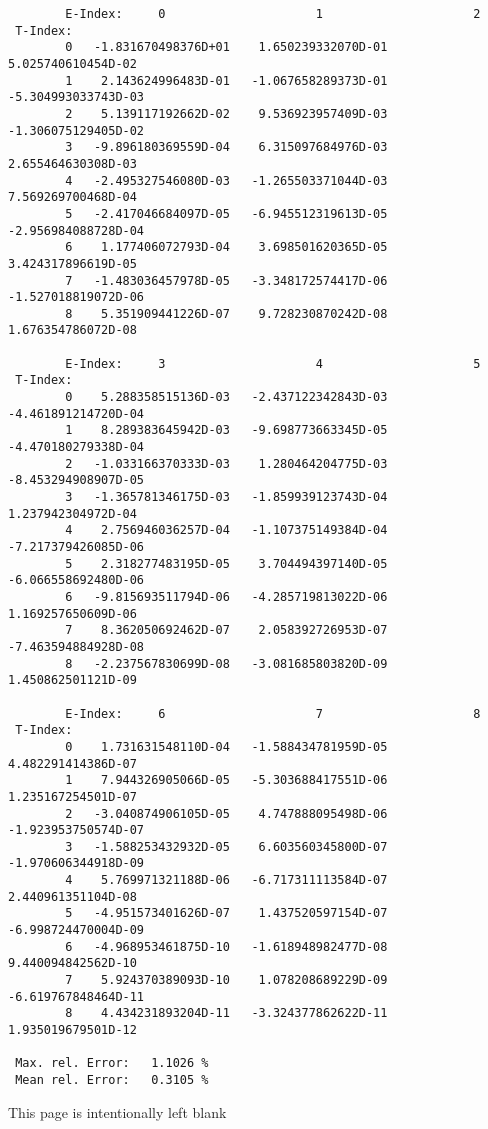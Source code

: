 \documentclass[12pt,dvipdfmx]{article}
\begin{document}
\begin{small}\begin{verbatim}
        E-Index:     0                     1                     2
 T-Index:
        0   -1.831670498376D+01    1.650239332070D-01    5.025740610454D-02
        1    2.143624996483D-01   -1.067658289373D-01   -5.304993033743D-03
        2    5.139117192662D-02    9.536923957409D-03   -1.306075129405D-02
        3   -9.896180369559D-04    6.315097684976D-03    2.655464630308D-03
        4   -2.495327546080D-03   -1.265503371044D-03    7.569269700468D-04
        5   -2.417046684097D-05   -6.945512319613D-05   -2.956984088728D-04
        6    1.177406072793D-04    3.698501620365D-05    3.424317896619D-05
        7   -1.483036457978D-05   -3.348172574417D-06   -1.527018819072D-06
        8    5.351909441226D-07    9.728230870242D-08    1.676354786072D-08

        E-Index:     3                     4                     5
 T-Index:
        0    5.288358515136D-03   -2.437122342843D-03   -4.461891214720D-04
        1    8.289383645942D-03   -9.698773663345D-05   -4.470180279338D-04
        2   -1.033166370333D-03    1.280464204775D-03   -8.453294908907D-05
        3   -1.365781346175D-03   -1.859939123743D-04    1.237942304972D-04
        4    2.756946036257D-04   -1.107375149384D-04   -7.217379426085D-06
        5    2.318277483195D-05    3.704494397140D-05   -6.066558692480D-06
        6   -9.815693511794D-06   -4.285719813022D-06    1.169257650609D-06
        7    8.362050692462D-07    2.058392726953D-07   -7.463594884928D-08
        8   -2.237567830699D-08   -3.081685803820D-09    1.450862501121D-09

        E-Index:     6                     7                     8
 T-Index:
        0    1.731631548110D-04   -1.588434781959D-05    4.482291414386D-07
        1    7.944326905066D-05   -5.303688417551D-06    1.235167254501D-07
        2   -3.040874906105D-05    4.747888095498D-06   -1.923953750574D-07
        3   -1.588253432932D-05    6.603560345800D-07   -1.970606344918D-09
        4    5.769971321188D-06   -6.717311113584D-07    2.440961351104D-08
        5   -4.951573401626D-07    1.437520597154D-07   -6.998724470004D-09
        6   -4.968953461875D-10   -1.618948982477D-08    9.440094842562D-10
        7    5.924370389093D-10    1.078208689229D-09   -6.619767848464D-11
        8    4.434231893204D-11   -3.324377862622D-11    1.935019679501D-12

 Max. rel. Error:   1.1026 %
 Mean rel. Error:   0.3105 %

\end{verbatim}\end{small}
\newpage
This page is intentionally left blank
\newpage
\end{document}
